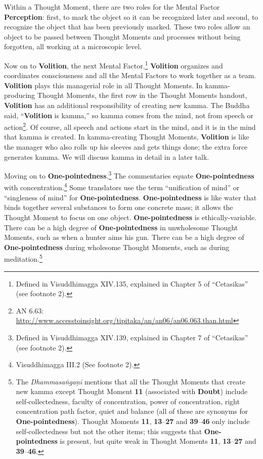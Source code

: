 Within a Thought Moment, there are two roles for the Mental Factor \textbf{Perception}: first, to mark the object so it can be recognized later and second, to recognize the object that has been previously marked. These two roles allow an object to be passed between Thought Moments and processes without being forgotten, all working at a microscopic level.

Now on to \textbf{Volition}, the next Mental Factor.\footnote{Defined in Visuddhimagga XIV.135, explained in Chapter 5 of “Cetasikas” (see footnote 2).} \textbf{Volition} organizes and coordinates consciousness and all the Mental Factors to work together as a team. \textbf{Volition} plays this managerial role in all Thought Moments. In kamma-producing Thought Moments, the first row in the Thought Moments handout, \textbf{Volition} has an additional responsibility of creating new kamma. The Buddha said, “\textbf{Volition} is kamma,” so kamma comes from the mind, not from speech or action\footnote{AN 6.63: \url{http://www.accesstoinsight.org/tipitaka/an/an06/an06.063.than.html}}. Of course, all speech and actions start in the mind, and it is in the mind that kamma is created. In kamma-creating Thought Moments, \textbf{Volition} is like the manager who also rolls up his sleeves and gets things done; the extra force generates kamma. We will discuss kamma in detail in a later talk.

Moving on to \textbf{One-pointedness}.\footnote{Defined in Visuddhimagga XIV.139, explained in Chapter 7 of “Cetasikas” (see footnote 2).} The commentaries equate \textbf{One-pointedness} with concentration.\footnote{Visuddhimagga III.2 (See footnote 2).} Some translators use the term “unification of mind” or “singleness of mind” for \textbf{One-pointedness}. \textbf{One-pointedness} is like water that binds together several substances to form one concrete mass; it allows the Thought Moment to focus on one object. \textbf{One-pointedness} is ethically-variable. There can be a high degree of \textbf{One-pointedness} in unwholesome Thought Moments, such as when a hunter aims his gun. There can be a high degree of \textbf{One-pointedness} during wholesome Thought Moments, such as during meditation.\footnote{The \textit{Dhammasaṅgaṇī} mentions that all the Thought Moments that create new kamma except Thought Moment \textbf{11} (associated with \textbf{Doubt}) include self-collectedness, faculty of concentration, power of concentration, right concentration path factor, quiet and balance (all of these are synonyms for \textbf{One-pointedness}). Thought Moments \textbf{11}, \textbf{13}--\textbf{27} and \textbf{39}--\textbf{46} only include self-collectedness but not the other items; this suggests that \textbf{One-pointedness} is present, but quite weak in Thought Moments \textbf{11}, \textbf{13}--\textbf{27} and \textbf{39}--\textbf{46}.}


